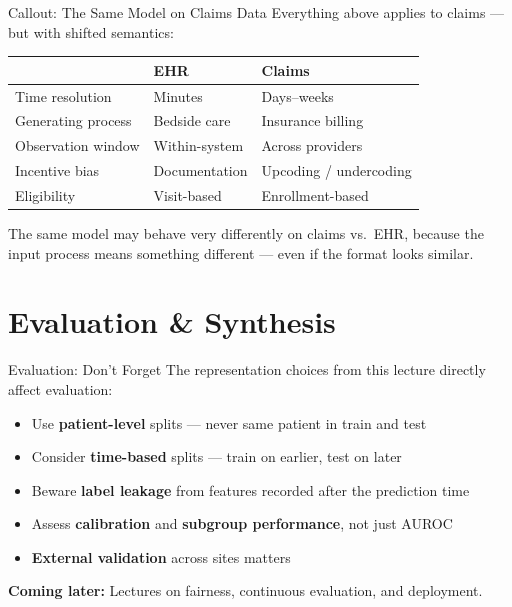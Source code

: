 \documentclass[aspectratio=169,10pt]{beamer}
\begin{document}
\begin{frame}{Callout: The Same Model on Claims Data}
Everything above applies to claims --- but with shifted semantics:
\vspace{0.3em}
{\small
\begin{center}
\begin{tabular}{lll}
\toprule
& \textbf{EHR} & \textbf{Claims} \\
\midrule
Time resolution & Minutes & Days--weeks \\
Generating process & Bedside care & Insurance billing \\
Observation window & Within-system & Across providers \\
Incentive bias & Documentation & Upcoding / undercoding \\
Eligibility & Visit-based & Enrollment-based \\
\bottomrule
\end{tabular}
\end{center}
}
\vspace{0.2em}
\pause
\alert{The same model may behave very differently on claims vs.\ EHR,} because the input process means something different --- even if the format looks similar.
\end{frame}

\section{Evaluation \& Synthesis}

\begin{frame}{Evaluation: Don't Forget}
The representation choices from this lecture directly affect evaluation:
\begin{itemize}[<+->]
    \item Use \textbf{patient-level} splits --- never same patient in train and test
    \item Consider \textbf{time-based} splits --- train on earlier, test on later
    \item Beware \textbf{label leakage} from features recorded after the prediction time
    \item Assess \textbf{calibration} and \textbf{subgroup performance}, not just AUROC
    \item \textbf{External validation} across sites matters
\end{itemize}
\pause
\vspace{0.2em}
\textbf{Coming later:} Lectures on fairness, continuous evaluation, and deployment.
\end{frame}
\end{document}
